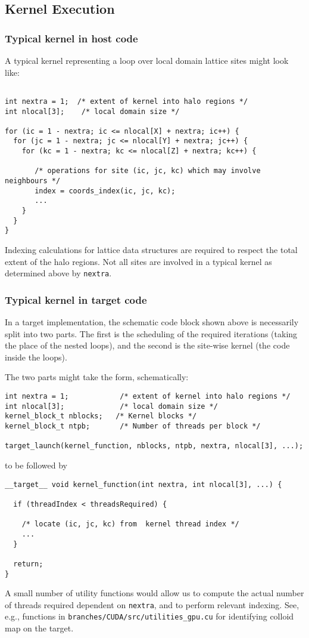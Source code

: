 \subsection{Kernel Execution}

\subsubsection{Typical kernel in host code}

A typical kernel representing a loop over local domain lattice sites
might look like:
\begin{lstlisting}

int nextra = 1;  /* extent of kernel into halo regions */
int nlocal[3];    /* local domain size */

for (ic = 1 - nextra; ic <= nlocal[X] + nextra; ic++) {
  for (jc = 1 - nextra; jc <= nlocal[Y] + nextra; jc++) {
    for (kc = 1 - nextra; kc <= nlocal[Z] + nextra; kc++) {

       /* operations for site (ic, jc, kc) which may involve neighbours */
       index = coords_index(ic, jc, kc);
       ...
    }
  }
}

\end{lstlisting}
Indexing calculations for lattice data structures are required to
respect the total extent of the halo regions. Not all sites are
involved in a typical kernel as determined above by \texttt{nextra}.

\subsubsection{Typical kernel in target code}

In a target implementation, the schematic code block shown above is necessarily
split into two parts. The first is the scheduling of the required
iterations (taking the place of the nested loops), and the second
is the site-wise kernel (the code inside the loops).

The two parts might take the form, schematically:
\begin{lstlisting}
int nextra = 1;            /* extent of kernel into halo regions */
int nlocal[3];             /* local domain size */
kernel_block_t nblocks;   /* Kernel blocks */
kernel_block_t ntpb;       /* Number of threads per block */

target_launch(kernel_function, nblocks, ntpb, nextra, nlocal[3], ...);
\end{lstlisting}
to be followed by
\begin{lstlisting}
__target__ void kernel_function(int nextra, int nlocal[3], ...) {

  if (threadIndex < threadsRequired) {

    /* locate (ic, jc, kc) from  kernel thread index */
    ...
  }

  return;
}

\end{lstlisting}
A small number of utility functions would allow us to compute the actual
number of threads required dependent on \texttt{nextra}, and to perform
relevant indexing. See, e.g., functions in
\texttt{branches/CUDA/src/utilities\_gpu.cu}
for identifying colloid map on the target.

